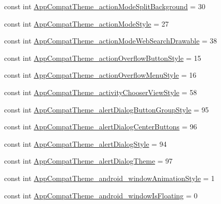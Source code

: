 \begin{DoxyCompactItemize}
\item 
const int \mbox{\hyperlink{class_f_w_p_s___app_1_1_droid_1_1_resource_1_1_styleable_a99d8c5d5961eed54909cd447cf3dd36f}{App\+Compat\+Theme\+\_\+action\+Mode\+Split\+Background}} = 30
\item 
const int \mbox{\hyperlink{class_f_w_p_s___app_1_1_droid_1_1_resource_1_1_styleable_ac9083a449f7ab8f58ec1889eea8076ce}{App\+Compat\+Theme\+\_\+action\+Mode\+Style}} = 27
\item 
const int \mbox{\hyperlink{class_f_w_p_s___app_1_1_droid_1_1_resource_1_1_styleable_a39b11229466f843e688d0194c87d00d8}{App\+Compat\+Theme\+\_\+action\+Mode\+Web\+Search\+Drawable}} = 38
\item 
const int \mbox{\hyperlink{class_f_w_p_s___app_1_1_droid_1_1_resource_1_1_styleable_a5a2e2c15d422649b54042b455b60f27c}{App\+Compat\+Theme\+\_\+action\+Overflow\+Button\+Style}} = 15
\item 
const int \mbox{\hyperlink{class_f_w_p_s___app_1_1_droid_1_1_resource_1_1_styleable_a6a6ef3116112fe32fc20d4367aa4cad2}{App\+Compat\+Theme\+\_\+action\+Overflow\+Menu\+Style}} = 16
\item 
const int \mbox{\hyperlink{class_f_w_p_s___app_1_1_droid_1_1_resource_1_1_styleable_a28d3830b9735cc5e29bbac8bccb29457}{App\+Compat\+Theme\+\_\+activity\+Chooser\+View\+Style}} = 58
\item 
const int \mbox{\hyperlink{class_f_w_p_s___app_1_1_droid_1_1_resource_1_1_styleable_a3b0f5e58d526cc9a8b7aa7a09d0e288e}{App\+Compat\+Theme\+\_\+alert\+Dialog\+Button\+Group\+Style}} = 95
\item 
const int \mbox{\hyperlink{class_f_w_p_s___app_1_1_droid_1_1_resource_1_1_styleable_ad5fe1c277f73aa8ba0bc3edf69c2fa6d}{App\+Compat\+Theme\+\_\+alert\+Dialog\+Center\+Buttons}} = 96
\item 
const int \mbox{\hyperlink{class_f_w_p_s___app_1_1_droid_1_1_resource_1_1_styleable_ad0e41e0555a77945cad9361d5d9f4bc0}{App\+Compat\+Theme\+\_\+alert\+Dialog\+Style}} = 94
\item 
const int \mbox{\hyperlink{class_f_w_p_s___app_1_1_droid_1_1_resource_1_1_styleable_a7f6f93fd508db1fcbdc483ab6cd4f4be}{App\+Compat\+Theme\+\_\+alert\+Dialog\+Theme}} = 97
\item 
const int \mbox{\hyperlink{class_f_w_p_s___app_1_1_droid_1_1_resource_1_1_styleable_ade6e50c2ca6151f49d1d771588afe14e}{App\+Compat\+Theme\+\_\+android\+\_\+window\+Animation\+Style}} = 1
\item 
const int \mbox{\hyperlink{class_f_w_p_s___app_1_1_droid_1_1_resource_1_1_styleable_a30672b268e795d922e9b184d8e8ef6f0}{App\+Compat\+Theme\+\_\+android\+\_\+window\+Is\+Floating}} = 0

\end{DoxyCompactItemize}
